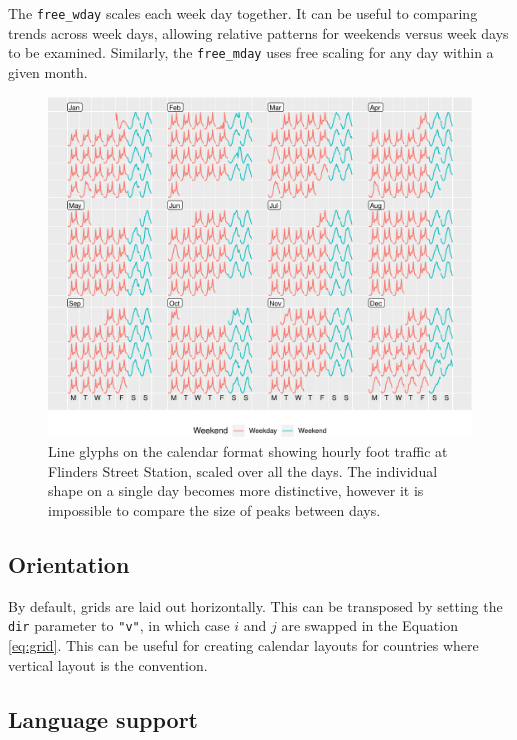 \documentclass[12pt]{article}
\begin{document}
The \texttt{free\_wday} scales each week day together. It can be useful
to comparing trends across week days, allowing relative patterns for
weekends versus week days to be examined. Similarly, the
\texttt{free\_mday} uses free scaling for any day within a given month.

\begin{figure}

{\centering \includegraphics[width=\textwidth]{figure/flinders-free-1} 

}

\caption{Line glyphs on the calendar format showing hourly foot traffic at Flinders Street Station, scaled over all the days. The individual shape on a single day becomes more distinctive, however it is impossible to compare the size of peaks between days.}\label{fig:flinders-free}
\end{figure}

\hypertarget{orientation}{%
\subsection{Orientation}\label{orientation}}

By default, grids are laid out horizontally. This can be transposed by
setting the \texttt{dir} parameter to \texttt{"v"}, in which case \(i\)
and \(j\) are swapped in the Equation \ref{eq:grid}. This can be useful
for creating calendar layouts for countries where vertical layout is the
convention.

\hypertarget{language-support}{%
\subsection{Language support}\label{language-support}}
\end{document}
